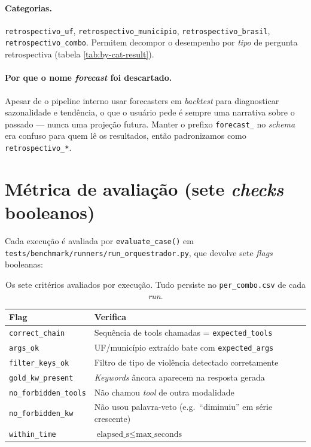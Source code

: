 \documentclass[11pt,a4paper]{article}
\newcommand{\code}[1]{\texttt{\small #1}}
\newcommand{\file}[1]{\texttt{\small\color{black!75} #1}}
\begin{document}
\paragraph{Categorias.} \code{retrospectivo\_uf},
\code{retrospectivo\_municipio}, \code{retrospectivo\_brasil},
\code{retrospectivo\_combo}. Permitem decompor o desempenho por
\emph{tipo} de pergunta retrospectiva (tabela \ref{tab:by-cat-result}).

\paragraph{Por que o nome \emph{forecast} foi descartado.} Apesar de o
pipeline interno usar forecasters em \emph{backtest} para diagnosticar
sazonalidade e tendência, o que o usuário pede é sempre uma narrativa
sobre o passado --- nunca uma projeção futura. Manter o prefixo
\code{forecast\_} no \emph{schema} era confuso para quem lê os
resultados, então padronizamos como \code{retrospectivo\_*}.

\section{Métrica de avaliação (sete \emph{checks} booleanos)}

Cada execução é avaliada por \code{evaluate\_case()} em
\file{tests/benchmark/runners/run\_orquestrador.py}, que devolve sete
\emph{flags} booleanas:

\begin{table}[h!]
\centering
\small
\begin{tabularx}{\textwidth}{@{}l X@{}}
\toprule
\textbf{Flag} & \textbf{Verifica} \\
\midrule
\code{correct\_chain}      & Sequência de tools chamadas = \code{expected\_tools} \\
\code{args\_ok}            & UF/município extraído bate com \code{expected\_args} \\
\code{filter\_keys\_ok}    & Filtro de tipo de violência detectado corretamente \\
\code{gold\_kw\_present}   & \emph{Keywords} âncora aparecem na resposta gerada \\
\code{no\_forbidden\_tools}& Não chamou \emph{tool} de outra modalidade \\
\code{no\_forbidden\_kw}   & Não usou palavra-veto (e.g.\ ``diminuiu'' em série crescente) \\
\code{within\_time}        & $\text{elapsed\_s} \le \text{max\_seconds}$ \\
\bottomrule
\end{tabularx}
\caption{Os sete critérios avaliados por execução. Tudo persiste no
\code{per\_combo.csv} de cada \emph{run}.}
\label{tab:flags}
\end{table}
\end{document}
